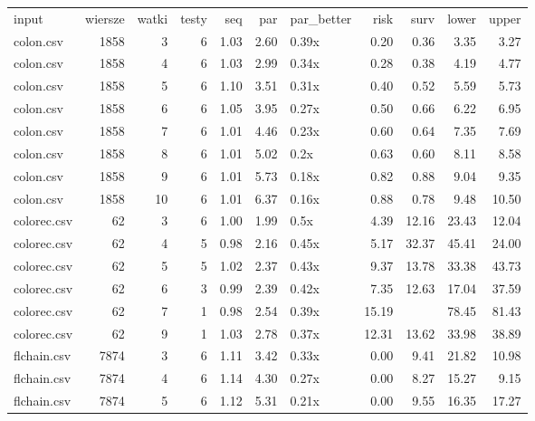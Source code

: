 \begin{table}[ht]
\centering
\begin{tabular}{lrrrrrlrrrr}
 input & wiersze & watki & testy & seq & par & par\_better & risk & surv & lower & upper \\ 
 colon.csv & 1858 &   3 &   6 & 1.03 & 2.60 & 0.39x & 0.20 & 0.36 & 3.35 & 3.27 \\ 
   \hline
colon.csv & 1858 &   4 &   6 & 1.03 & 2.99 & 0.34x & 0.28 & 0.38 & 4.19 & 4.77 \\ 
   \hline
colon.csv & 1858 &   5 &   6 & 1.10 & 3.51 & 0.31x & 0.40 & 0.52 & 5.59 & 5.73 \\ 
   \hline
colon.csv & 1858 &   6 &   6 & 1.05 & 3.95 & 0.27x & 0.50 & 0.66 & 6.22 & 6.95 \\ 
   \hline
colon.csv & 1858 &   7 &   6 & 1.01 & 4.46 & 0.23x & 0.60 & 0.64 & 7.35 & 7.69 \\ 
   \hline
colon.csv & 1858 &   8 &   6 & 1.01 & 5.02 & 0.2x & 0.63 & 0.60 & 8.11 & 8.58 \\ 
   \hline
colon.csv & 1858 &   9 &   6 & 1.01 & 5.73 & 0.18x & 0.82 & 0.88 & 9.04 & 9.35 \\ 
   \hline
colon.csv & 1858 &  10 &   6 & 1.01 & 6.37 & 0.16x & 0.88 & 0.78 & 9.48 & 10.50 \\ 
   \hline
colorec.csv &  62 &   3 &   6 & 1.00 & 1.99 & 0.5x & 4.39 & 12.16 & 23.43 & 12.04 \\ 
   \hline
colorec.csv &  62 &   4 &   5 & 0.98 & 2.16 & 0.45x & 5.17 & 32.37 & 45.41 & 24.00 \\ 
   \hline
colorec.csv &  62 &   5 &   5 & 1.02 & 2.37 & 0.43x & 9.37 & 13.78 & 33.38 & 43.73 \\ 
   \hline
colorec.csv &  62 &   6 &   3 & 0.99 & 2.39 & 0.42x & 7.35 & 12.63 & 17.04 & 37.59 \\ 
   \hline
colorec.csv &  62 &   7 &   1 & 0.98 & 2.54 & 0.39x & 15.19 &  & 78.45 & 81.43 \\ 
   \hline
colorec.csv &  62 &   9 &   1 & 1.03 & 2.78 & 0.37x & 12.31 & 13.62 & 33.98 & 38.89 \\ 
   \hline
flchain.csv & 7874 &   3 &   6 & 1.11 & 3.42 & 0.33x & 0.00 & 9.41 & 21.82 & 10.98 \\ 
   \hline
flchain.csv & 7874 &   4 &   6 & 1.14 & 4.30 & 0.27x & 0.00 & 8.27 & 15.27 & 9.15 \\ 
   \hline
flchain.csv & 7874 &   5 &   6 & 1.12 & 5.31 & 0.21x & 0.00 & 9.55 & 16.35 & 17.27 \\ 

\end{tabular}
\end{table}
